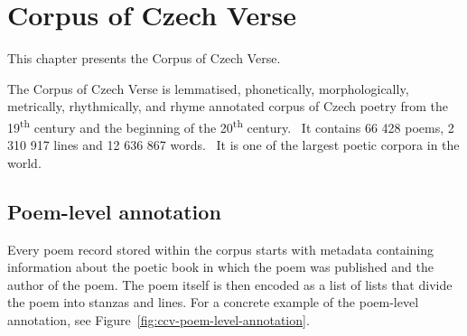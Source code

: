 \chapter{Corpus of Czech Verse}\label{chap:ccv}

\begin{chapterabstract}
This chapter presents the Corpus of Czech Verse.
\end{chapterabstract}

The Corpus of Czech Verse is lemmatised, phonetically, morphologically, metrically, rhythmically, and rhyme annotated corpus of Czech poetry from the 19\textsuperscript{th} century and the beginning of the 20\textsuperscript{th} century.~\cite{KorpusCeskehoVerse} It contains 66 428 poems, 2 310 917 lines and 12 636 867 words.~\cite{GitCorpusCzechVerse} It is one of the largest poetic corpora in the world.~\cite{KorpusCeskehoVerse}

\section{Poem-level annotation}
Every poem record stored within the corpus starts with metadata containing information about the poetic book in which the poem was published and the author of the poem. The poem itself is then encoded as a list of lists that divide the poem into stanzas and lines. For a concrete example of the poem-level annotation, see Figure~\ref{fig:ccv-poem-level-annotation}.~\cite{GitCorpusCzechVerse}

